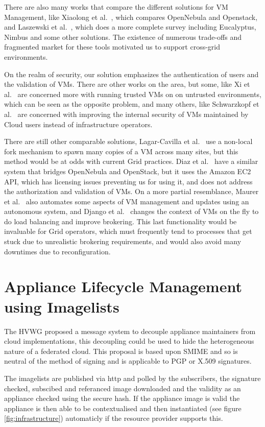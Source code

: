 \documentclass{cai}
\begin{document}
There are also many works that compare the different solutions for VM Management, like Xiaolong et al.~\cite{Xiaolong2012}, which compares OpenNebula and Openstack, and Laszewski et al.~\cite{Laszewski2012}, which does a more complete survey including Eucalyptus, Nimbus and some other solutions. The existence of numerous trade-offs and fragmented market for these tools motivated us to support cross-grid environments.

On the realm of security, our solution emphasizes the authentication of users and the validation of VMs. There are other works on the area, but some, like Xi et al.~\cite{Xi2012} are concerned more with running trusted VMs on on untrusted environments, which can be seen as the opposite problem, and many others, like Schwarzkopf et al.~\cite{Schwarzkopf2012} are concerned with improving the internal security of VMs maintained by Cloud users instead of infrastructure operators.

There are still other comparable solutions, Lagar-Cavilla et al.~\cite{Lagar-Cavilla2009} use a non-local fork mechanism to spawn many copies of a VM across many sites, but this method would be at odds with current Grid practices. Diaz et al.~\cite{Diaz2012} have a similar system that bridges OpenNebula and OpenStack, but it uses the Amazon EC2 API, which has licensing issues preventing us for using it, and does not address the authorization and validation of VMs. On a more partial resemblance, Maurer et al.~\cite{Maurer2013} also automates some aspects of VM management and updates using an autonomous system, and Django et al.~\cite{Django2013} changes the context of VMs on the fly to do load balancing and improve brokering. This last functionality would be invaluable for Grid operators, which must frequently tend to processes that get stuck due to unrealistic brokering requirements, and would also avoid many downtimes due to reconfiguration.


\section{Appliance Lifecycle Management using Imagelists}
\label{sect-vmcaster}
The HVWG proposed a message system to decouple appliance maintainers from cloud implementations, this decoupling could be used to hide the heterogeneous nature of a federated cloud. 
This proposal is based upon SMIME and so is neutral of the method of signing and is applicable to PGP or X.509 signatures.

The imagelists are published via http and polled by the subscribers, the signature checked, subscibed and referanced image downloaded and the validity as an appliance checked using the secure hash. 
If the appliance image is valid the appliance is then able to be contextualised and then instantiated (see figure \ref{fig:infrastructure}) automaticly if the resource provider supports this.
\end{document}
